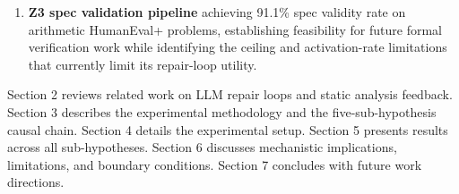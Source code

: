 \begin{enumerate}
\item \textbf{Z3 spec validation pipeline} achieving 91.1\% spec validity rate on arithmetic HumanEval+ problems, establishing feasibility for future formal verification work while identifying the ceiling and activation-rate limitations that currently limit its repair-loop utility.
\end{enumerate}

Section 2 reviews related work on LLM repair loops and static analysis feedback. Section 3 describes the experimental methodology and the five-sub-hypothesis causal chain. Section 4 details the experimental setup. Section 5 presents results across all sub-hypotheses. Section 6 discusses mechanistic implications, limitations, and boundary conditions. Section 7 concludes with future work directions.

